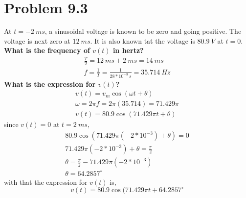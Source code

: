 \documentclass[12pt]{article}
\begin{document}
    \section*{Problem 9.3}
    At $t = -2\ ms$, a sinusoidal voltage is known to be zero and going positive.
    The voltage is next zero at $12\ ms$. It is also known tat the voltage is
    $80.9\ V$ at $t = 0$. \\
    \textbf{What is the frequency of $v(t)$ in hertz?}
    \begin{gather*}
        \frac{T}{2} = 12\ ms + 2\ ms = 14\ ms \\
        f = \frac{1}{T} = \frac{1}{28*10^{-3}\ s} = \boxed{35.714\ Hz}
    \end{gather*}
    \textbf{What is the expression for $v(t)$?}
    \begin{gather*}
        v(t) = v_{m} \cos (\omega t + \theta) \\
        \omega = 2 \pi f = 2 \pi (35.714) = 71.429 \pi \\
        v(t) = 80.9 \cos (71.429 \pi t + \theta)
    \end{gather*}
    since $v(t) = 0$ at $t = 2\ ms$,
    \begin{gather*}
        80.9 \cos (71.429 \pi (-2*10^{-3}) + \theta) = 0 \\
        71.429 \pi (-2*10^{-3}) + \theta = \frac{\pi}{2} \\
        \theta = \frac{\pi}{2} - 71.429 \pi (-2*10^{-3}) \\
        \theta = 64.2857^{\circ}
    \end{gather*}
    with that the expression for $v(t)$ is,
    \[
        \boxed{v(t) = 80.9 \cos (71.429 \pi t + 64.2857^{\circ}}
    \]
\end{document}
